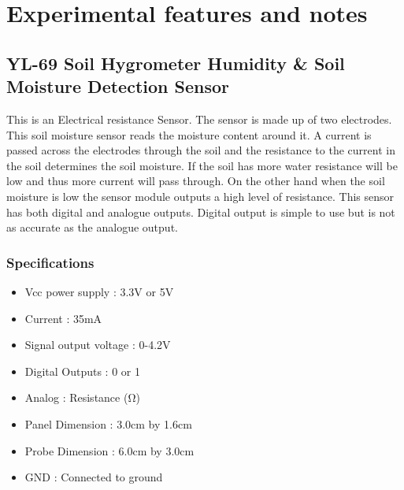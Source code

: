 \documentclass[16pt]{article}
\begin{document}
\vspace{5cm}

\section{Experimental features and notes}

\vspace{0.5cm}



\subsection{YL-69 Soil Hygrometer Humidity \& Soil Moisture Detection Sensor}


\vspace{0.3cm}
This is an Electrical resistance Sensor. The sensor is made up of two
electrodes. This soil moisture sensor reads the moisture content around
it. A current is passed across the electrodes through the soil and the
resistance to the current in the soil determines the soil moisture. If
the soil has more water resistance will be low and thus more current
will pass through. On the other hand when the soil moisture is low the
sensor module outputs a high level of resistance. This sensor has both
digital and analogue outputs. Digital output is simple to use but is not
as accurate as the analogue output.




\vspace{0.5cm}

\subsubsection{Specifications}

\begin{itemize}

\item
  Vcc power supply : 3.3V or 5V
\item
  Current : 35mA
\item
  Signal output voltage : 0-4.2V
\item
  Digital Outputs : 0 or 1
\item
  Analog : Resistance (Ω)
\item
  Panel Dimension : 3.0cm by 1.6cm
\item
  Probe Dimension : 6.0cm by 3.0cm
\item
  GND : Connected to ground
\end{itemize}
\end{document}
